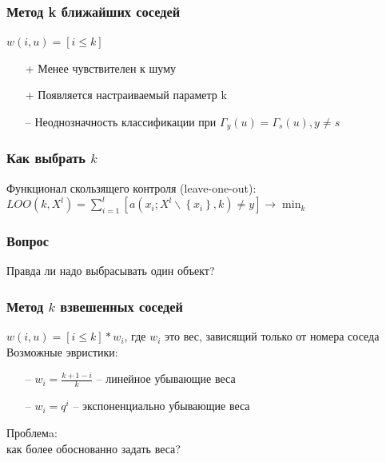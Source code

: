 \documentclass[12pt]{beamer}
\begin{document}
\begin{frame}\frametitle{Метод k ближайших соседей}
${w(i, u) = [i \leq k]}$\\
\vspace{5mm}
\begin{itemize}
	\item[+] Менее чувствителен к шуму
	\item[+] Появляется настраиваемый параметр k
\end{itemize}
\begin{itemize}
\item[--] Неоднозначность классификации при ${\Gamma_y(u) = \Gamma_s(u), y \neq s}$
\end{itemize}

\end{frame}
\begin{frame}\frametitle{Как выбрать $k$}
Функционал скользящего контроля (leave-one-out):\\
${LOO(k, X^l) = \sum\limits_{i=1}^l [a(x_i; X^l \backslash \left\{x_i\right\}, k) \neq y] \rightarrow \min_k}$\\
\vspace{5mm}

\end{frame}

\begin{frame}\frametitle{Вопрос}
Правда ли надо выбрасывать один объект?
\end{frame}


\begin{frame}\frametitle{Метод $k$ взвешенных соседей}
${w(i,u) = [i \leq k] * w_i}$, где $w_i$ это вес, зависящий только от номера соседа\\
\vspace{5mm}
Возможные эвристики:\\
\begin{itemize}
\item[--] ${w_i = \frac{k+1-i}{k}}$ -- линейное убывающие веса\\ %
\item[--] ${w_i = q^i}$ -- экспоненциально убывающие веса\\

\end{itemize}
\vspace{5mm}
Проблемa:\\
как более обоснованно задать веса?\\
\end{frame}
\end{document}
